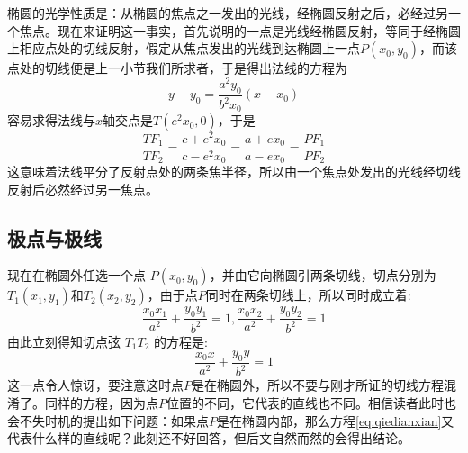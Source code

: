 椭圆的光学性质是：从椭圆的焦点之一发出的光线，经椭圆反射之后，必经过另一个焦点。现在来证明这一事实，首先说明的一点是光线经椭圆反射，等同于经椭圆上相应点处的切线反射，假定从焦点发出的光线到达椭圆上一点$P(x_0,y_0)$，而该点处的切线便是上一小节我们所求者，于是得出法线的方程为
\begin{equation*}
y-y_0=\frac{a^2y_0}{b^2x_0}(x-x_0)
\end{equation*}
容易求得法线与$x$轴交点是$T(e^2x_0,0)$，于是
\begin{equation*}
  \frac{TF_1}{TF_2}=\frac{c+e^2x_0}{c-e^2x_0}=\frac{a+ex_0}{a-ex_0}=\frac{PF_1}{PF_2}
\end{equation*}
这意味着法线平分了反射点处的两条焦半径，所以由一个焦点处发出的光线经切线反射后必然经过另一焦点。

\subsection{极点与极线}
\label{sec:oval-polor-point-and-polor-line}

现在在椭圆外任选一个点 $P(x_0,y_0)$，并由它向椭圆引两条切线，切点分别为 $T_1(x_1,y_1)$和$T_2(x_2,y_2)$，由于点$P$同时在两条切线上，所以同时成立着:
\begin{equation}
\frac{x_0 x_1}{a^2}+\frac{y_0 y_1}{b^2} = 1,\frac{x_0 x_2}{a^2}+\frac{y_0 y_2}{b^2} = 1
\end{equation}
由此立刻得知切点弦 $T_1 T_2$ 的方程是:
\begin{equation}
\frac{x_0x}{a^2}+\frac{y_0y}{b^2}=1   \label{eq:qiedianxian}
\end{equation}
这一点令人惊讶，要注意这时点$P$是在椭圆外，所以不要与刚才所证的切线方程混淆了。同样的方程，因为点$P$位置的不同，它代表的直线也不同。相信读者此时也会不失时机的提出如下问题：如果点$P$是在椭圆内部，那么方程\ref{eq:qiedianxian}又代表什么样的直线呢？此刻还不好回答，但后文自然而然的会得出结论。

